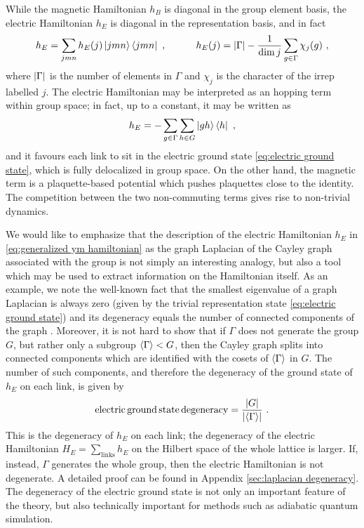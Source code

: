 While the magnetic Hamiltonian $h_B$ is diagonal in the group element basis, the electric Hamiltonian $h_E$ is diagonal in the representation basis, and in fact
\begin{equation}
    \label{eq:electric hamiltonian rep basis}
    h_E = \sum_{jmn} h_E(j) \ket{jmn}\bra{jmn} \ , \quad \quad \quad h_E(j)=\abs{\Gamma} - \frac{1}{\dim{j}} \sum_{g \in \Gamma} \chi_j(g)\ ,
\end{equation}
where $\abs{\Gamma}$ is the number of elements in $\Gamma$ and $\chi_j$ is the character of the irrep labelled $j$.
The electric Hamiltonian may be interpreted as an  hopping term within group space; in fact, up to a constant, it may be written as
\begin{equation}
    h_E = -\sum_{g \in \Gamma} \sum_{h \in G} \ket{gh}\bra{h} \ ,
\end{equation}
 and it favours each link to sit in the electric ground state \eqref{eq:electric ground state}, which is fully delocalized in group space.
On the other hand, the magnetic term is a plaquette-based potential which pushes plaquettes close to the identity.
The competition between the two non-commuting terms gives rise to non-trivial dynamics.

\medskip

We would like to emphasize that the description of the electric Hamiltonian $h_E$ in \eqref{eq:generalized ym hamiltonian} as the graph Laplacian of the Cayley graph associated with the group is not simply an interesting analogy, but also a tool which may be used to extract information on the Hamiltonian itself.
As an example, we note the well-known fact that the smallest eigenvalue of a graph Laplacian is always zero (given by the trivial representation state \eqref{eq:electric ground state}) and its degeneracy equals the number of connected components of the graph \cite{spectralgraphtheory}.
Moreover, it is not hard to show that if $\Gamma$ does not generate the group $G$, but rather only a subgroup $\expval{\Gamma} < G$, then the Cayley graph splits into connected components which are identified with the cosets of $\expval{\Gamma}$ in $G$.
The number of such components, and therefore the degeneracy of the ground state of $h_E$ on each link, is given by
\begin{equation}
    \mathrm{electric\,ground\,state\,degeneracy}=\frac{\abs{G}}{\abs{\expval{\Gamma}}} \ .
\end{equation}
This is the degeneracy of $h_E$ on each link; the degeneracy of the electric Hamiltonian $H_E = \sum_{\mathrm{links}} h_E$ on the Hilbert space of the whole lattice is larger.
If, instead, $\Gamma$ generates the whole group, then the electric Hamiltonian is not degenerate.
A detailed proof can be found in Appendix \ref{sec:laplacian degeneracy}.
The degeneracy of the electric ground state is not only an important feature of the theory, but also technically important for methods such as adiabatic quantum simulation.

